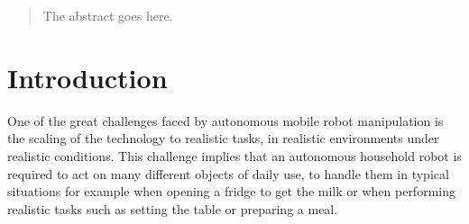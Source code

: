 \documentclass[conference]{sty/IEEEtran}
\begin{document}
\maketitle

\begin{abstract}
The abstract goes here.

\end{abstract}

\IEEEpeerreviewmaketitle

\section{Introduction}
One of the great challenges faced by autonomous mobile robot
manipulation is the scaling of the technology to realistic tasks, in
realistic environments under realistic conditions. This challenge
implies that an autonomous household robot is required to act on many
different objects of daily use, to handle them in typical situations
for example when opening a fridge to get the milk or when performing
realistic tasks such as setting the table or preparing a meal.
\end{document}
